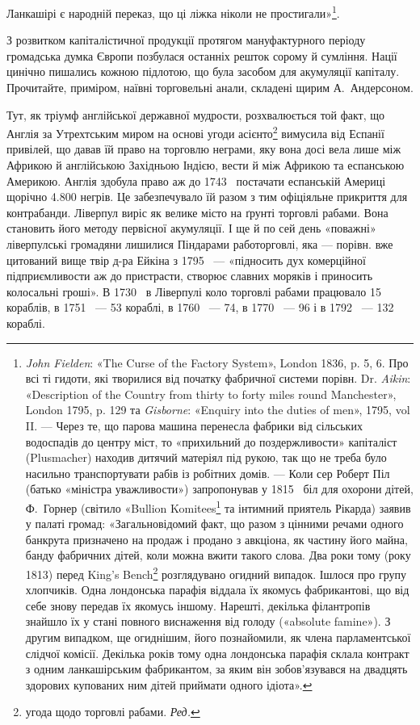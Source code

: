 Ланкашірі є народній переказ, що ці ліжка ніколи не простигали»\footnote{
\emph{John Fielden}: «The Curse of the Factory System», London 1836, p. 5, 6.
Про всі ті гидоти, які творилися від початку фабричної системи порівн.
Dr. \emph{Aikin}: «Description of the Country from thirty to forty miles round
Manchester», London 1795, p. 129 та \emph{Gisborne}: «Enquiry into the duties of
men», 1795, vol II. — Через те, що парова машина перенесла
фабрики від сільських водоспадів до центру міст, то «прихильний до поздержливости»
капіталіст (Plusmacher) находив дитячий матеріял під рукою, так що не треба було
насильно транспортувати рабів із робітних домів. — Коли сер Роберт Піл
(батько «міністра уважливости») запропонував у 1815~ біл
для охорони дітей, Ф.~Горнер (світило «Bullion Komitees\footnote*{
комітет у справах зливків. \emph{Ред.}
} та інтимний приятель Рікарда) заявив у палаті громад:
«Загальновідомий факт, що разом з цінними речами одного банкрута
призначено на продаж і продано з авкціона, як частину його майна, банду
фабричних дітей, коли можна вжити такого слова. Два роки тому (року
1813) перед King’s Bench\footnote*{
найвищим судом. \emph{Ред.}
} розглядувано огидний випадок. Ішлося про
групу хлопчиків. Одна лондонська парафія віддала їх якомусь фабрикантові,
що від себе знову передав їх якомусь іншому. Нарешті, декілька філантропів
знайшло їх у стані повного виснаження від голоду («absolute
famine»). З другим випадком, ще огиднішим, його познайомили, як члена
парламентської слідчої комісії. Декілька років тому одна лондонська
парафія склала контракт з одним ланкашірським фабрикантом, за яким
він зобов’язувався на двадцять здорових купованих ним дітей приймати
одного ідіота».
}.

З розвитком капіталістичної продукції протягом мануфактурного
періоду громадська думка Європи позбулася останніх решток
сорому й сумління. Нації цинічно пишались кожною підлотою,
що була засобом для акумуляції капіталу. Прочитайте, приміром,
наївні торговельні анали, складені щирим А.~Андерсоном.

Тут, як тріумф англійської державної мудрости, розхвалюється
той факт, що Англія за Утрехтським миром на основі
угоди асієнто\footnote*{
угода щодо торговлі рабами. \emph{Ред.}
} вимусила від Еспанії привілей, що давав їй
право на торговлю неграми, яку вона досі вела лише між Африкою
й англійською Західньою Індією, вести й між Африкою та
еспанською Америкою. Англія здобула право аж до 1743~ постачати
еспанській Америці щорічно \num{4.800} негрів. Це забезпечувало
їй разом з тим офіціяльне прикриття для контрабанди.
Ліверпул виріс як велике місто на ґрунті торговлі рабами.
Вона становить його методу первісної акумуляції. І ще й по сей
день «поважні» ліверпулські громадяни лишилися Піндарами
работорговлі, яка — порівн. вже цитований вище твір д-ра Ейкіна
з 1795~ — «підносить дух комерційної підприємливости аж до
пристрасти, створює славних моряків і приносить колосальні
гроші». В 1730~ в Ліверпулі коло торговлі рабами працювало
15 кораблів, в 1751~ — 53 кораблі, в 1760~ — 74, в 1770~ —
96 і в 1792~ — 132 кораблі.

